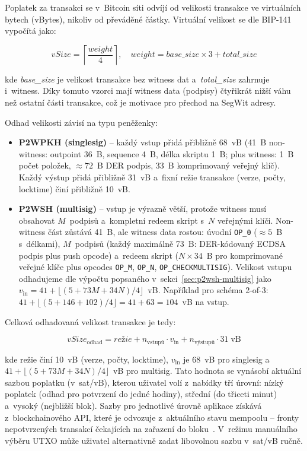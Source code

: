 Poplatek za transakci se v~Bitcoin síti odvíjí od velikosti transakce
ve virtuálních bytech (vBytes), nikoliv od převáděné částky. Virtuální
velikost se dle BIP-141~\cite{BIP141} vypočítá jako:

\[
\mathit{vSize} = \left\lceil \frac{\mathit{weight}}{4} \right\rceil, \quad
\mathit{weight} = \mathit{base\_size} \times 3 + \mathit{total\_size}
\]

\noindent kde \emph{base\_size} je velikost transakce bez witness dat
a~\emph{total\_size} zahrnuje i~witness. Díky tomuto vzorci mají witness
data (podpisy) čtyřikrát nižší váhu než ostatní části transakce, což je
motivace pro přechod na SegWit adresy.

Odhad velikosti závisí na typu peněženky:

\begin{itemize}
\item \textbf{P2WPKH (singlesig)} -- každý vstup přidá přibližně 68~vB
  (41~B non-witness: outpoint 36~B, sequence 4~B, délka skriptu 1~B;
  plus witness: 1~B počet položek, ${\approx}72$~B DER podpis,
  33~B komprimovaný veřejný klíč). Každý výstup přidá přibližně 31~vB
  a~fixní režie transakce (verze, počty, locktime) činí přibližně 10~vB.

\item \textbf{P2WSH (multisig)} -- vstup je výrazně větší, protože
  witness musí obsahovat $M$~podpisů a~kompletní redeem skript s~$N$
  veřejnými klíči. Non-witness část zůstává 41~B, ale witness data
  rostou: úvodní \texttt{OP\_0} (${\approx}5$~B s~délkami), $M$~podpisů
  (každý maximálně 73~B: DER-kódovaný ECDSA podpis plus push opcode)
  a~redeem skript ($N \times 34$~B pro komprimované veřejné klíče plus
  opcodes \texttt{OP\_M}, \texttt{OP\_N}, \texttt{OP\_CHECKMULTISIG}).
  Velikost vstupu odhadujeme dle výpočtu popsaného
  v~sekci~\ref{sec:p2wsh-multisig} jako
  $v_{\text{in}} = 41 + \lfloor (5 + 73M + 34N)/4 \rfloor$~vB.
  Například pro schéma 2-of-3: $41 + \lfloor (5 + 146 + 102)/4 \rfloor
  = 41 + 63 = 104$~vB na vstup.
\end{itemize}

Celková odhadovaná velikost transakce je tedy:

\[
\mathit{vSize}_{\text{odhad}} = \mathit{režie} + n_{\text{vstupů}} \cdot v_{\text{in}} + n_{\text{výstupů}} \cdot 31 \;\text{vB}
\]

\noindent kde režie činí 10~vB (verze, počty, locktime), $v_{\text{in}}$
je 68~vB pro singlesig a~$41 + \lfloor (5 + 73M + 34N)/4 \rfloor$~vB
pro multisig. Tato hodnota se vynásobí aktuální sazbou poplatku
(v~sat/vB), kterou uživatel volí z~nabídky tří úrovní: nízký poplatek
(odhad pro potvrzení do jedné hodiny), střední (do třiceti minut) a~vysoký
(nejbližší blok). Sazby pro jednotlivé úrovně aplikace získává
z~blockchainového API, které je odvozuje z~aktuálního stavu mempoolu --
fronty nepotvrzených transakcí čekajících na zařazení do
bloku~\cite{MempoolAPI}. V~režimu manuálního výběru UTXO může uživatel
alternativně zadat libovolnou sazbu v~sat/vB ručně.

